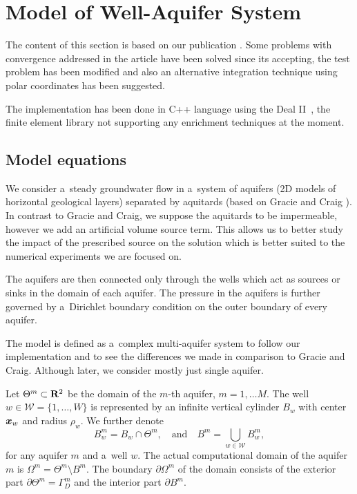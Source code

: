 \section{Model of Well-Aquifer System} 
\label{sec:model_aquifer}
The content of this section is based on our publication \cite{exner_2016}. Some problems with convergence addressed in the article
have been solved since its accepting, the test problem has been modified and also an alternative integration technique
using polar coordinates has been suggested.

The implementation has been done in C++ language using the Deal II~\cite{bangerth_deal.ii_2007}, 
the finite element library not supporting any enrichment techniques at the moment.

\subsection{Model equations}
We consider a~steady groundwater flow in a~system of aquifers (2D models of horizontal geological layers) separated by aquitards
(based on Gracie and Craig \cite{gracie_modelling_2010,craig_using_2011}).
In contrast to Gracie and Craig, we suppose the aquitards to be impermeable, 
however we add an artificial volume source term. This allows us to better study the impact of 
the prescribed source on the solution which is better suited to the numerical experiments we are focused on. 

The aquifers are then connected only through the wells 
which act as sources or sinks in the domain of each aquifer. The pressure in the aquifers is further governed 
by a~Dirichlet boundary condition on the outer boundary of every aquifer.

The model is defined as a~complex multi-aquifer system to follow our implementation and to see the differences
we made in comparison to Gracie and Craig. Although later, we consider mostly just single aquifer.

Let $\Theta^m\subset {\rm\bf R}^2$ be the domain of the $m$-th aquifer, $m=1,\ldots M$.
The well $w\in\mathcal{W}=\{1,\ldots,W\}$ is represented by an infinite vertical cylinder $B_w$
with center $\mathbf{\boldsymbol{x}}_w$ and radius $\rho_w$.  We further denote 
\[
 B^m_w = B_w \cap \Theta^m, \quad \text{and} \quad
 B^m=\bigcup_{w\in \mathcal{W}}B^m_w,
\]
for any aquifer $m$ and a~well $w$.
The actual computational domain of the aquifer $m$ is $\Omega^m = \Theta^m\setminus B^m$. The boundary $\partial\Omega^m$ of 
the domain consists of the exterior part $\partial\Theta^m=\Gamma^m_D$ and the interior part $\partial B^m$.


